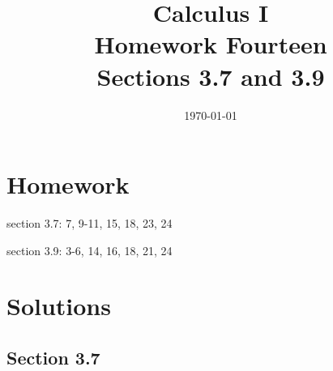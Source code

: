 \documentclass[letterpaper, landscape]{exam}
\title{Calculus I \\ Homework Fourteen \\ Sections 3.7 and 3.9}
\author{}
\date{\today}
\begin{document}
  \maketitle

  \section{Homework}
    \begin{itemize*}
      \item section 3.7: 7, 9-11, 15, 18, 23, 24 
      \item section 3.9: 3-6, 14, 16, 18, 21, 24
    \end{itemize*}

  \ifprintanswers

  \section{Solutions}

  \subsection{Section 3.7}
\end{document}
